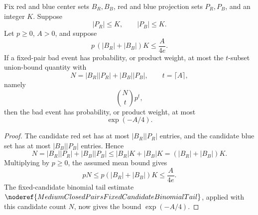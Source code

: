 \begin{lemma}
Fix red and blue center sets \(B_R,B_B\), red and blue projection sets
\(P_R,P_B\), and an integer \(K\).  Suppose
\[
|P_R|\le K,\qquad |P_B|\le K.
\]
Let \(p\ge0\), \(A>0\), and suppose
\[
p\,(|B_R|+|B_B|)K\le \frac{A}{4e}.
\]
If a fixed-pair bad event has probability, or product weight, at most the
\(t\)-subset union-bound quantity with
\[
N=|B_R||P_R|+|B_B||P_B|,\qquad t=\lceil A\rceil,
\]
namely
\[
\binom Nt p^t,
\]
then the bad event has probability, or product weight, at most
\[
\exp(-A/4).
\]
\end{lemma}
\begin{proof}
The candidate red set has at most \(|B_R||P_R|\) entries, and the candidate
blue set has at most \(|B_B||P_B|\) entries.  Hence
\[
N=|B_R||P_R|+|B_B||P_B|
\le |B_R|K+|B_B|K=(|B_R|+|B_B|)K.
\]
Multiplying by \(p\ge0\), the assumed mean bound gives
\[
pN\le p(|B_R|+|B_B|)K\le \frac{A}{4e}.
\]
The fixed-candidate binomial tail estimate
\(\noderef{MediumClosedPairsFixedCandidateBinomialTail}\), applied with this
candidate count \(N\), now gives the bound \(\exp(-A/4)\).
\end{proof}
